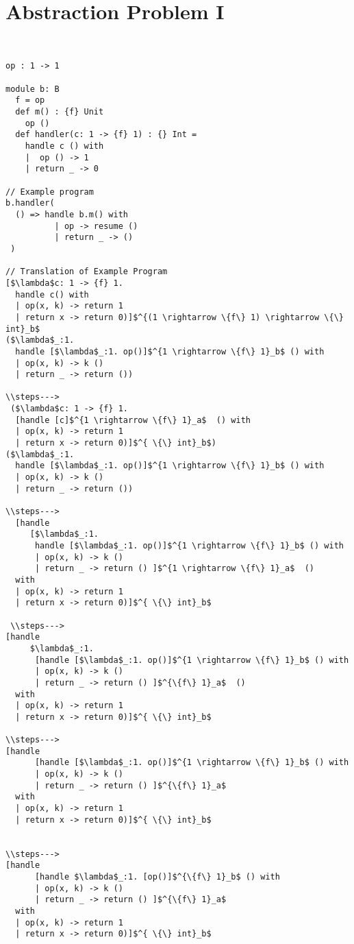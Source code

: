 \section{Abstraction Problem I}
\begin{lstlisting}


op : 1 -> 1
  
module b: B
  f = op
  def m() : {f} Unit
    op ()
  def handler(c: 1 -> {f} 1) : {} Int = 
    handle c () with
    |  op () -> 1
    | return _ -> 0

// Example program
b.handler(
  () => handle b.m() with
          | op -> resume ()
          | return _ -> ()
 )

// Translation of Example Program
[$\lambda$c: 1 -> {f} 1. 
  handle c() with 
  | op(x, k) -> return 1
  | return x -> return 0)]$^{(1 \rightarrow \{f\} 1) \rightarrow \{\} int}_b$
($\lambda$_:1. 
  handle [$\lambda$_:1. op()]$^{1 \rightarrow \{f\} 1}_b$ () with
  | op(x, k) -> k ()
  | return _ -> return ())
  
\\steps--->
 ($\lambda$c: 1 -> {f} 1. 
  [handle [c]$^{1 \rightarrow \{f\} 1}_a$  () with 
  | op(x, k) -> return 1
  | return x -> return 0)]$^{ \{\} int}_b$)
($\lambda$_:1. 
  handle [$\lambda$_:1. op()]$^{1 \rightarrow \{f\} 1}_b$ () with
  | op(x, k) -> k ()
  | return _ -> return ())
  
\\steps--->
  [handle 
     [$\lambda$_:1. 
      handle [$\lambda$_:1. op()]$^{1 \rightarrow \{f\} 1}_b$ () with
      | op(x, k) -> k ()
      | return _ -> return () ]$^{1 \rightarrow \{f\} 1}_a$  () 
  with 
  | op(x, k) -> return 1
  | return x -> return 0)]$^{ \{\} int}_b$
 
 \\steps--->
[handle 
     $\lambda$_:1. 
      [handle [$\lambda$_:1. op()]$^{1 \rightarrow \{f\} 1}_b$ () with
      | op(x, k) -> k ()
      | return _ -> return () ]$^{\{f\} 1}_a$  () 
  with 
  | op(x, k) -> return 1
  | return x -> return 0)]$^{ \{\} int}_b$
  
\\steps--->
[handle 
      [handle [$\lambda$_:1. op()]$^{1 \rightarrow \{f\} 1}_b$ () with
      | op(x, k) -> k ()
      | return _ -> return () ]$^{\{f\} 1}_a$ 
  with 
  | op(x, k) -> return 1
  | return x -> return 0)]$^{ \{\} int}_b$
  

\\steps--->
[handle 
      [handle $\lambda$_:1. [op()]$^{\{f\} 1}_b$ () with
      | op(x, k) -> k ()
      | return _ -> return () ]$^{\{f\} 1}_a$ 
  with 
  | op(x, k) -> return 1
  | return x -> return 0)]$^{ \{\} int}_b$
  

\end{lstlisting}
